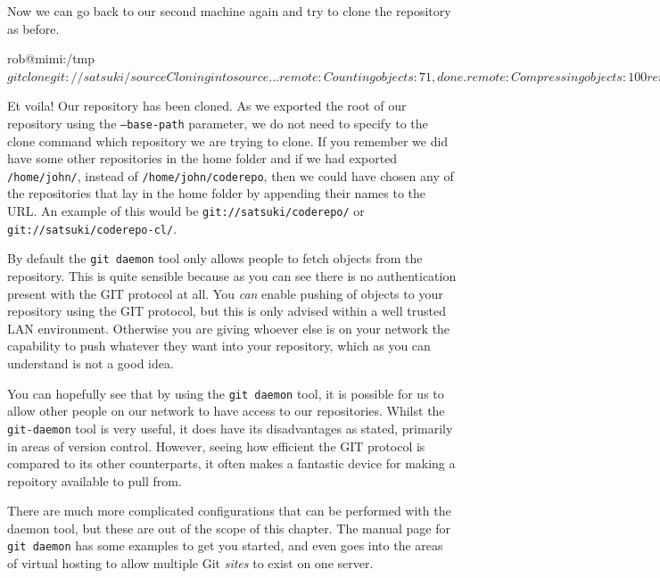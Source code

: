 Now we can go back to our second machine again and try to clone the repository as before.

\begin{code}
rob@mimi:/tmp$ git clone git://satsuki/ source
Cloning into source...
remote: Counting objects: 71, done.
remote: Compressing objects: 100%
remote: Total 71 (delta 16), reused 0 (delta 0)
Receiving objects: 100%
Resolving deltas: 100%
rob@mimi:/tmp$
\end{code}

Et voila! Our repository has been cloned.
As we exported the root of our repository using the \texttt{--base-path} parameter, we do not need to specify to the clone command which repository we are trying to clone.
If you remember we did have some other repositories in the home folder and if we had exported \texttt{/home/john/}, instead of \texttt{/home/john/coderepo},
then we could have chosen any of the repositories that lay in the home folder by appending their names to the URL.
An example of this would be \texttt{git://satsuki/coderepo/} or \texttt{git://satsuki/coderepo-cl/}.

By default the \texttt{git daemon} tool only allows people to fetch objects from the repository.
This is quite sensible because as you can see there is no authentication present with the GIT protocol at all.
You \emph{can} enable pushing of objects to your repository using the GIT protocol, but this is only advised within a well trusted LAN environment.
Otherwise you are giving whoever else is on your network the capability to push whatever they want into your repository, which as you can understand is not a good idea.

You can hopefully see that by using the \texttt{git daemon} tool, it is possible for us to allow other people on our network to have access to our repositories.
Whilst the \texttt{git-daemon} tool is very useful, it does have its disadvantages as stated, primarily in areas of version control.
However, seeing how efficient the GIT protocol is compared to its other counterparts, it often makes a fantastic device for making a repoitory available to pull from.

There are much more complicated configurations that can be performed with the daemon tool, but these are out of the scope of this chapter.
The manual page for \texttt{git daemon} has some examples to get you started,
and even goes into the areas of virtual hosting to allow multiple Git \emph{sites} to exist on one server.

